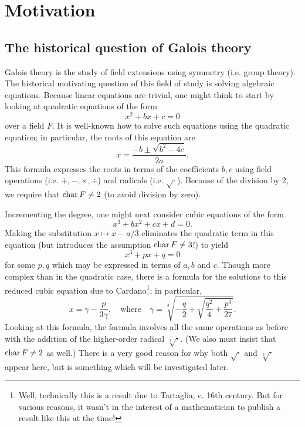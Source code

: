 \chapter{Motivation}

\section{The historical question of Galois theory}

Galois theory is the study of field extensions using symmetry (i.e. group theory). The historical motivating question of this field of study is solving algebraic equations. Because linear equations are trivial, one might think to start by looking at quadratic equations of the form
\[
    x^2 + bx + c = 0
\]
over a field $F$. It is well-known how to solve such equations using the quadratic equation; in particular, the roots of this equation are
\[
    x = \frac{-b \pm \sqrt{b^2 - 4c}}{2a}.
\]
This formula expresses the roots in terms of the coefficients $b, c$ using field operations (i.e. $+, -, \times, \div$) and radicals (i.e. $\sqrt{\cdot}$). Because of the division by 2, we require that $\operatorname{char}{{F}} \neq 2$ (to avoid division by zero).

Incrementing the degree, one might next consider cubic equations of the form
\[
    x^3 + bx^2 + cx + d = 0.
\]
Making the substitution $x \mapsto x - a/3$ eliminates the quadratic term in this equation (but introduces the assumption $\operatorname{char}{{F}} \neq 3$!) to yield
\[
    x^3 + px + q = 0
\]
for some $p, q$ which may be expressed in terms of $a, b$ and $c$. Though more complex than in the quadratic case, there is a formula for the solutions to this reduced cubic equation due to Cardano\footnote{Well, technically this is a result due to Tartaglia, c. 16th century. But for various reasons, it wasn't in the interest of a mathematician to publish a result like this at the time!}; in particular,
\[
    x = \gamma - \frac{p}{3\gamma},
    \quad \text{where} \quad
    \gamma = \sqrt[3]{-\frac{q}{2} + \sqrt{\frac{q^2}{4} + \frac{p^3}{27}}}.
\]
Looking at this formula, the formula involves all the same operations as before with the addition of the higher-order radical $\sqrt[3]{\cdot}$. (We also must insist that $\operatorname{char}{{F}} \neq 2$ as well.) There is a very good reason for why both $\sqrt{\cdot}$ and $\sqrt[3]{\cdot}$ appear here, but is something which will be investigated later.

